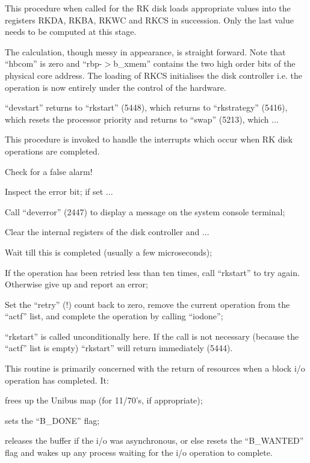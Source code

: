 
This procedure when called for the RK
disk loads appropriate values into the
registers RKDA, RKBA, RKWC and RKCS in
succession. Only the last value needs
to be computed at this stage.

The calculation, though messy in
appearance, is straight forward. Note
that ``hbcom'' is zero and ``rbp-$>$b\_xmem''
contains the two high order bits of the
physical core address. The loading of
RKCS initialises the disk controller
i.e. the operation is now entirely
under the control of the hardware.

``devstart'' returns to ``rkstart'' (5448),
which returns to ``rkstrategy'' (5416),
which resets the processor priority and
returns to ``swap'' (5213), which ...


This procedure is invoked to handle the
interrupts which occur when RK disk
operations are completed.

\bd
\item[5455:] Check for a false alarm!

\item[5459:] Inspect the error bit; if set ...

\item[5460:] Call ``deverror'' (2447) to display
a message on the system console
terminal;

\item[5461:] Clear the internal registers of
 the disk controller and ...

\item[5462:] Wait till this is completed (usually a few microseconds);

\item[5463:] If the operation has been retried
 less than ten times, call
 ``rkstart'' to try again. Otherwise
 give up and report an error;

\item[5469:] Set the ``retry'' (!) count back to
 zero, remove the current operation from the ``actf'' list, and
 complete the operation by calling
 ``iodone'';

\item[5472:] ``rkstart'' is called unconditionally here. If the call is not
 necessary (because the ``actf''
 list is empty) ``rkstart'' will
 return immediately (5444).
\ed



This routine is primarily concerned
with the return of resources when a
block i/o operation has completed. It:

\bi
\item frees up the Unibus map (for 11/70's,
 if appropriate);

\item sets the ``B\_DONE'' flag;

\item releases the buffer if the i/o was
 asynchronous, or else resets the
 ``B\_WANTED'' flag and wakes up any
 process waiting for the i/o
 operation to complete.
\ei

